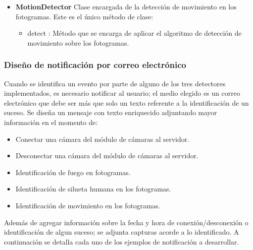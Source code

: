 \begin{itemize}
\begin{itemize}
        \end{itemize}
    \item \textbf{MotionDetector} Clase encargada de la detección de movimiento en los fotogramas. Este es el único método de clase:
        \begin{itemize}
            \item detect : Método que se encarga de aplicar el algoritmo de detección de movimiento sobre los fotogramas.
        \end{itemize}
\end{itemize}

\subsubsection{Diseño de notificación por correo electrónico}
Cuando se identifica un evento por parte de alguno de los tres detectores implementados, es necesario notificar al usuario; el medio elegido es un correo electrónico que debe ser más que solo un texto referente a la identificación de un suceso. Se diseña un mensaje con texto enriquecido adjuntando mayor información en el momento de:
\begin{itemize}
    \item Conectar una cámara del módulo de cámaras al servidor.
    \item Desconectar una cámara del módulo de cámaras al servidor.
    \item Identificación de fuego en fotogramas.
    \item Identificación de silueta humana en los fotogramas.
    \item Identificación de movimiento en los fotogramas.
\end{itemize}
Además de agregar información sobre la fecha y hora de conexión/desconexión o identificación de algun suceso; se adjunta capturas acorde a lo identificado. A continuación se detalla cada uno de los ejemplos de notificación a desarrollar.

